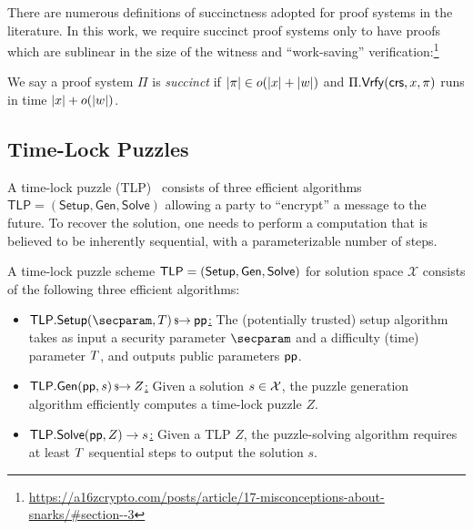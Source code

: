 There are numerous definitions of succinctness adopted for proof systems in the literature. In this work, we require succinct proof systems only to have proofs which are sublinear in the size of the witness and ``work-saving'' verification:\footnote{\url{https://a16zcrypto.com/posts/article/17-misconceptions-about-snarks/\#section--3}}

\begin{definition}[succinctness]
    We say a proof system $\Pi$ is \emph{succinct} if $\lvert \pi \rvert \in o(\lvert x \rvert + \lvert w \rvert)$ and $\Pi.\mathsf{Vrfy}(\mathsf{crs}, x, \pi)$ runs in time $\lvert x \rvert + o(\lvert w \rvert)$.
\end{definition}


\subsection{Time-Lock Puzzles}\label{sec:tlp}

A time-lock puzzle (TLP)~\cite{RivShaWag96} consists of three efficient algorithms $\mathsf{TLP} = (\mathsf{Setup}, \mathsf{Gen}, \mathsf{Solve})$ allowing a party to ``encrypt'' a message to the future. To recover the solution, one needs to perform a computation that is believed to be inherently sequential, with a parameterizable number of steps.

\begin{definition} A time-lock puzzle scheme $\sf TLP = (\mathsf{Setup}, \mathsf{Gen}, \mathsf{Solve})$ for solution space $\mathcal{X}$ consists of the following three efficient algorithms:
    \begin{itemize}
        \item \underline{$\mathsf{TLP.Setup}(\secparam, \Ttime) \randout \pparam$:} The (potentially trusted) setup algorithm takes as input a security parameter $\secparam$ and a difficulty (time) parameter $T$, and outputs public parameters $\mathsf{pp}$. %
        \item \underline{$\mathsf{TLP.Gen}(\mathsf{pp}, s) \,{\mbox{\scriptsize${\$}$\normalsize}\!\!\to}\hskip2.3pt Z$:} Given a solution $s \in \mathcal{X}$, the puzzle generation algorithm efficiently computes a time-lock puzzle $Z$.
        \item \underline{$\mathsf{TLP.Solve}(\mathsf{pp}, Z) \rightarrow s$:} Given a TLP $Z$, the puzzle-solving algorithm requires at least $T$ sequential steps to output the solution $s$.
    \end{itemize}
\end{definition}

